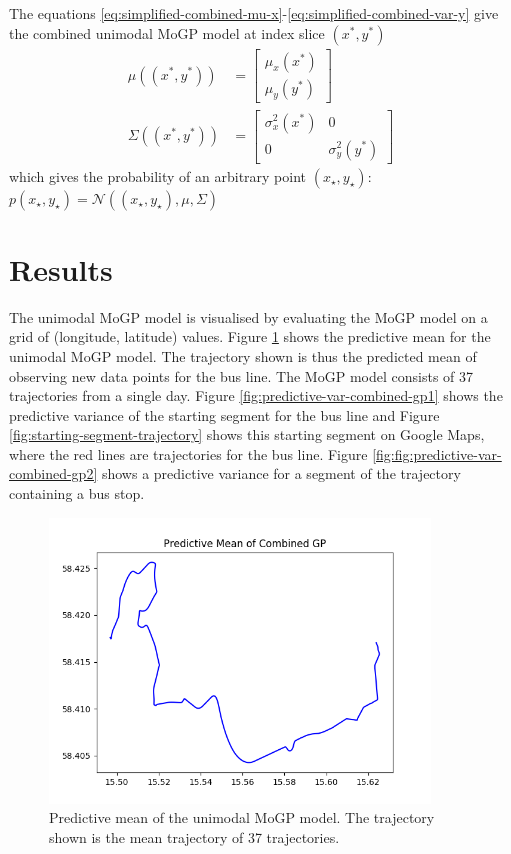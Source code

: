 The equations \ref{eq:simplified-combined-mu-x}-\ref{eq:simplified-combined-var-y} give the combined unimodal MoGP model at index slice $(x^*, y^*)$
\begin{align}
\mu((x^*, y^*)) &= \begin{bmatrix} \mu_x(x^*) \\ \mu_y(y^*) \end{bmatrix} \\
\Sigma((x^*, y^*)) &= \begin{bmatrix} \sigma^2_x(x^*) & 0 \\ 0 & \sigma^2_y(y^*) \end{bmatrix}
\end{align}
which gives the probability of an arbitrary point $(x_\star, y_\star)$: $p(x_\star, y_\star) = \mathcal{N}((x_\star, y_\star), \mu, \Sigma)$

\section{Results}

The unimodal MoGP model is visualised by evaluating the MoGP model on a grid of (longitude, latitude) values.
Figure \ref{fig:predictive-mean-combined-gp} shows the predictive mean for the unimodal MoGP model.
The trajectory shown is thus the predicted mean of observing new data points for the bus line.
The MoGP model consists of 37 trajectories from a single day. 
Figure \ref{fig:predictive-var-combined-gp1} shows the predictive variance of the starting segment for the bus line and Figure \ref{fig:starting-segment-trajectory} shows this starting segment on Google Maps, where the red lines are trajectories for the bus line.
Figure \ref{fig:fig:predictive-var-combined-gp2} shows a predictive variance for a segment of the trajectory containing a bus stop.
\begin{figure}[t!]
    \centering
    \includegraphics[width=0.9\textwidth]{figures/combined_gp}
    \caption[Predictive mean of the unimodal MoGP model]
    {\small Predictive mean of the unimodal MoGP model. 
    The trajectory shown is the mean trajectory of 37 trajectories.}
    \label{fig:predictive-mean-combined-gp}
\end{figure}

